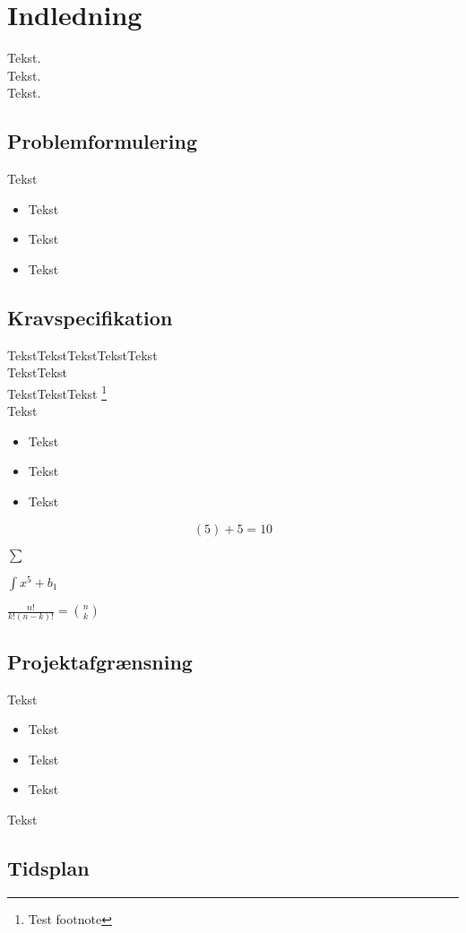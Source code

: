 \section{Indledning}

Tekst.\\

Tekst.\\

Tekst.\\




\subsection{Problemformulering}

Tekst
\begin{itemize}
	\item Tekst
	\item Tekst
	\item Tekst
\end{itemize}

\subsection{Kravspecifikation}

TekstTekstTekstTekstTekst\\
TekstTekst\\
TekstTekstTekst \footnote{Test footnote}\\
Tekst

\begin{itemize}
	\item Tekst
	\item Tekst
	\item Tekst

\end{itemize}

\[(5)+5=10\]


$\displaystyle \sum$


$\displaystyle \int x^5+b_1$


$\frac{n!}{k!(n-k)!} = \binom{n}{k}$

\subsection{Projektafgrænsning}

Tekst

\begin{itemize}
	\item Tekst
	\item Tekst
	\item Tekst
\end{itemize}

Tekst


\subsection{Tidsplan}